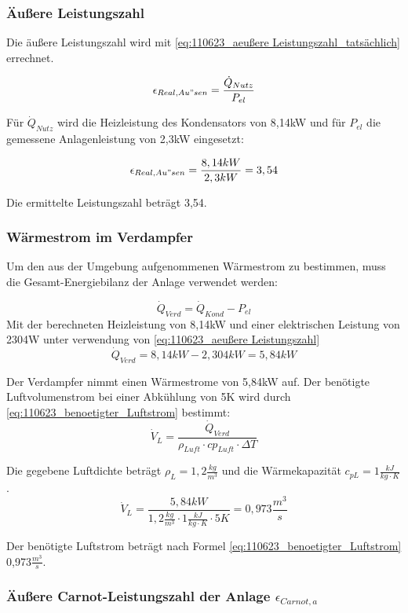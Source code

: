 \subsubsection{Äußere Leistungszahl}
Die äußere Leistungszahl wird mit \autoref{eq:110623_aeußere Leistungszahl_tatsächlich} errechnet. 

\begin{equation}
\epsilon_{Real,Au"sen} = \frac{\dot Q_{Nutz}}{P_{el}}
\label{eq:110623_aeußere Leistungszahl_tatsächlich}
\end{equation}

Für $\dot Q_{Nutz}$ wird die Heizleistung des Kondensators von 8,14kW und für $P_{el}$ die gemessene Anlagenleistung von 2,3kW eingesetzt:

$$ \epsilon_{Real,Au"sen} = \frac{8,14 kW}{2,3 kW} = 3,54$$

Die ermittelte Leistungszahl beträgt 3,54.

\subsubsection{Wärmestrom im Verdampfer}
Um den aus der Umgebung aufgenommenen Wärmestrom zu bestimmen, muss die Gesamt-Energiebilanz der Anlage verwendet werden:

\begin{equation}
\dot Q_{Verd}=\dot Q_{Kond}-P_{el}
\label{eq:110623_aeußere Leistungszahl}
\end{equation}
Mit der berechneten Heizleistung von 8,14kW und einer elektrischen Leistung von 2304W unter verwendung von \autoref{eq:110623_aeußere Leistungszahl}
$$\dot Q_{Verd}= 8,14 kW-2,304 kW= 5,84kW $$


Der Verdampfer nimmt einen Wärmestrome von 5,84kW auf.
Der benötigte Luftvolumenstrom bei einer Abkühlung von 5K wird durch \autoref{eq:110623_benoetigter_Luftstrom} bestimmt:
\begin{equation}
\dot V_{L}=\frac{\dot Q_{Verd}}{\rho_{Luft} \cdot cp_{Luft} \cdot \Delta T}
\label{eq:110623_benoetigter_Luftstrom}
\end{equation}

Die gegebene Luftdichte  beträgt $\rho_L = 1,2\frac{kg}{m^3}$ und die Wärmekapazität $c_{pL}= 1\frac{kJ}{kg \cdot K}$. 
$$\dot V_{L}=\frac{5,84 kW}{ 1,2 \frac{kg}{m^3} \cdot 1 \frac{kJ}{kg \cdot K} \cdot 5K}= 0,973 \frac{m^3}{s}$$


Der benötigte Luftstrom beträgt nach Formel \ref{eq:110623_benoetigter_Luftstrom} 0,973$\frac{m^3}{s}$. 
\newpage
\subsubsection{Äußere Carnot-Leistungszahl der Anlage \texorpdfstring{$\epsilon_{Carnot,a}$}{}}
\label{subsubsec:Carnot}

